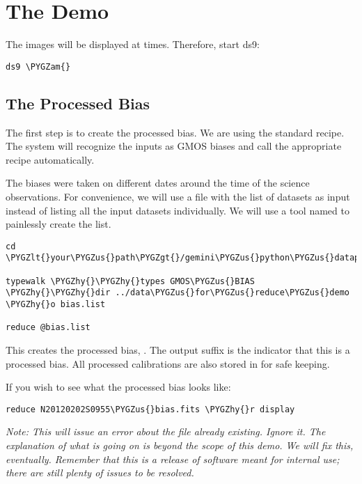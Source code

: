 \documentclass[letterpaper,10pt,english]{sphinxmanual}
\def\PYGZus{\char`\_}
\def\PYGZam{\char`\&}
\def\PYGZlt{\char`\<}
\def\PYGZgt{\char`\>}
\def\PYGZhy{\char`\-}
\begin{document}
\section{The Demo}
\label{appendices/appendix_demo:the-demo}
The images will be displayed at times.  Therefore, start ds9:

\begin{Verbatim}[commandchars=\\\{\}]
ds9 \PYGZam{}
\end{Verbatim}


\subsection{The Processed Bias}
\label{appendices/appendix_demo:the-processed-bias}
The first step is to create the processed bias.  We are using the standard
recipe.  The system will recognize the inputs as GMOS biases and call the
appropriate recipe automatically.

The biases were taken on different dates
around the time of the science observations.  For convenience, we will use
a file with the list of datasets as input instead of listing all the input
datasets individually.  We will use a tool named  to painlessly
create the list.

\begin{Verbatim}[commandchars=\\\{\}]
cd \PYGZlt{}your\PYGZus{}path\PYGZgt{}/gemini\PYGZus{}python\PYGZus{}datapkg\PYGZhy{}X1/playground

typewalk \PYGZhy{}\PYGZhy{}types GMOS\PYGZus{}BIAS \PYGZhy{}\PYGZhy{}dir ../data\PYGZus{}for\PYGZus{}reduce\PYGZus{}demo \PYGZhy{}o bias.list

reduce @bias.list
\end{Verbatim}

This creates the processed bias, .  The output suffix
 is the indicator that this is a processed bias.  All processed calibrations
are also stored in  for safe keeping.

If you wish to see what the processed bias looks like:

\begin{Verbatim}[commandchars=\\\{\}]
reduce N20120202S0955\PYGZus{}bias.fits \PYGZhy{}r display
\end{Verbatim}

\emph{Note: This will issue an error about the file already existing.  Ignore it.
The explanation of what is going on is beyond the scope of this demo.  We
will fix this, eventually.  Remember that this is a release of software meant
for internal use; there are still plenty of issues to be resolved.}
\end{document}
